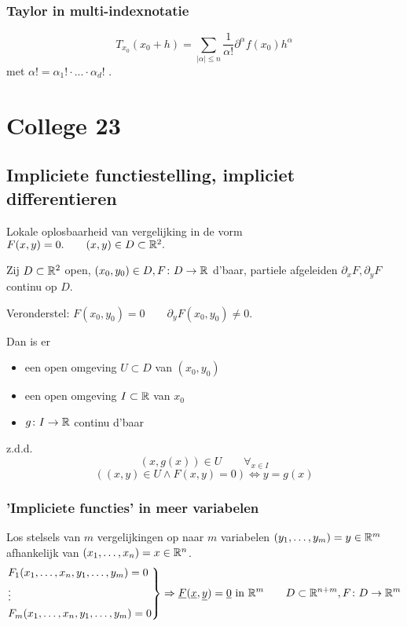 \documentclass{2wa40summary}
\begin{document}
			\subsubsection{Taylor in multi-indexnotatie}
				\[ T_{x_0} (x_0 + h) = \sum_{|\alpha|\le n} \frac{1}{\alpha !} \partial^\alpha f(x_0)h^\alpha \] met $ \alpha ! = \alpha_1 ! \cdot ... \cdot \alpha_d !$ .
		
	\newpage
	\section{College 23}
		\subsection{Impliciete functiestelling, impliciet differentieren}
			Lokale oplosbaarheid van vergelijking in de vorm $ F(x,y)=0. \qquad (x,y) \in D \subset \mathbb{R}^2. $
			
			 Zij $D \subset \mathbb{R}^2$ open, $ (x_0 , y_0 ) \in D, F\colon D \to \mathbb{R} $ d'baar, partiele afgeleiden $ \partial_x F, \partial_y F $ continu op $ D $.
			
			Veronderstel: $ F(x_0, y_0) = 0 \qquad \partial_y F(x_0, y_0)\neq 0 $.
			
			Dan is er 
			\begin{itemize} 
				\item[] een open omgeving $ U \subset D $ van $ (x_0,y_0) $
				\item[] een open omgeving $ I \subset \mathbb{R} $ van $ x_0 $
				\item[] $ g\colon  I \to \mathbb{R} $ continu d'baar 
			\end{itemize}
			z.d.d.
			\[ (x,g(x)) \in U \qquad \forall_{x \in I} \]
			\[ ((x,y) \in U \wedge F(x,y)=0) \Leftrightarrow y=g(x) \]
			
			
			\subsubsection{'Impliciete functies' in meer variabelen}
				Los stelsels van $m$ vergelijkingen op naar $m$ variabelen $(y_1, \dots ,y_m) = y \in \mathbb{R}^m$ afhankelijk van $ (x_1, \dots , x_n) = x \in \mathbb{R}^n $.
				\[
				\begin{rcases*}
				F_1(x_1,\dots,x_n,y_1,\dots,y_m)=0 \\
				\vdots \\
				F_m(x_1,\dots,x_n,y_1,\dots,y_m)=0
				\end{rcases*} \Rightarrow \underline{F}(\underline{x},\underline{y})=\underline{0} \text{ in } \reals^m \qquad D \subset \reals^{n+m}, F\:  D \to \reals^m
				\]
				
\end{document}
